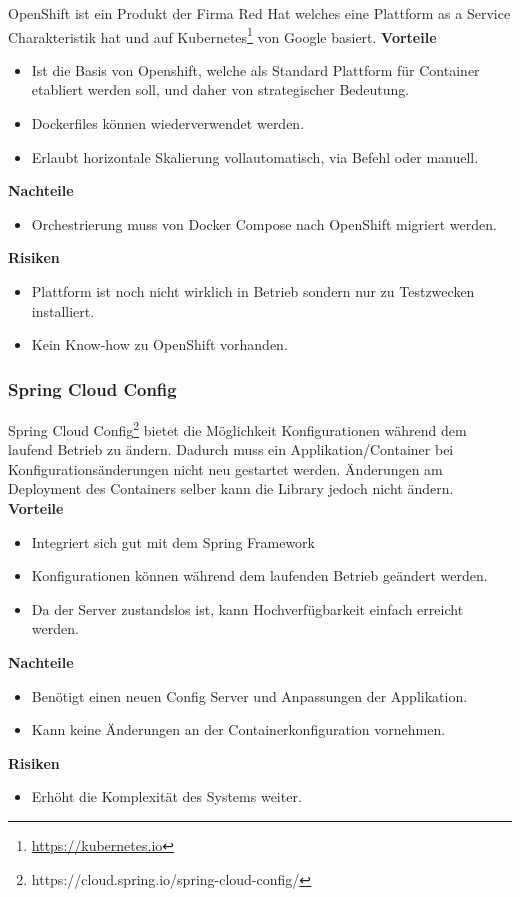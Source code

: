 OpenShift ist ein Produkt der Firma Red Hat welches eine Plattform as a Service Charakteristik hat und auf Kubernetes\footnote{\url{https://kubernetes.io}} von Google basiert.
\textbf{Vorteile}
\begin{itemize}
	\item Ist die Basis von Openshift, welche als Standard Plattform für Container etabliert werden soll, und daher von strategischer Bedeutung.
	\item Dockerfiles können wiederverwendet werden.
	\item Erlaubt horizontale Skalierung vollautomatisch, via Befehl oder manuell.
\end{itemize}
\textbf{Nachteile}
\begin{itemize}
	\item Orchestrierung muss von Docker Compose nach OpenShift migriert werden.
\end{itemize}
\textbf{Risiken}
\begin{itemize}
	\item Plattform ist noch nicht wirklich in Betrieb sondern nur zu Testzwecken installiert.
	\item Kein Know-how zu OpenShift vorhanden.
\end{itemize}

\subsubsection{Spring Cloud Config}
Spring Cloud Config\footnote{https://cloud.spring.io/spring-cloud-config/} bietet die Möglichkeit Konfigurationen während dem laufend Betrieb zu ändern. Dadurch muss ein Applikation/Container bei Konfigurationsänderungen nicht neu gestartet werden. Änderungen am Deployment des Containers selber kann die Library jedoch nicht ändern.\newline
\newpage
\textbf{Vorteile}
\begin{itemize}
	\item Integriert sich gut mit dem Spring Framework
	\item Konfigurationen können während dem laufenden Betrieb geändert werden.
	\item Da der Server zustandslos ist, kann Hochverfügbarkeit einfach erreicht werden.
\end{itemize}
\textbf{Nachteile}
\begin{itemize}
	\item Benötigt einen neuen Config Server und Anpassungen der Applikation.
	\item Kann keine Änderungen an der Containerkonfiguration vornehmen.
\end{itemize}
\textbf{Risiken}
\begin{itemize}
	\item Erhöht die Komplexität des Systems weiter.
\end{itemize}

